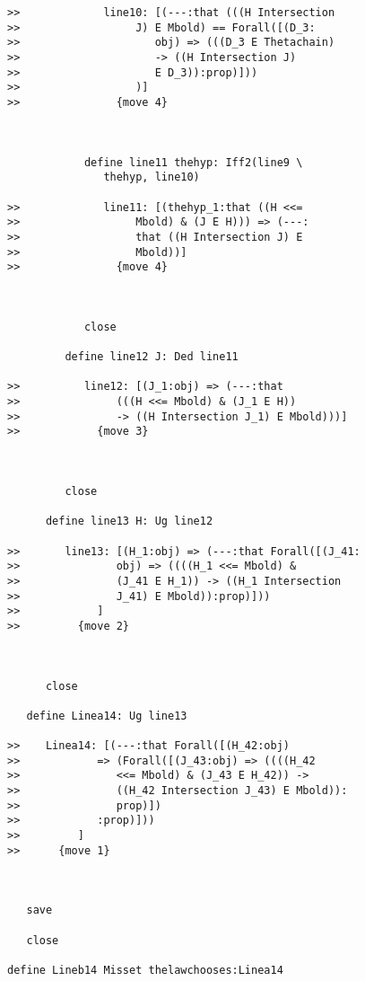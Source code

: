 \documentclass[12pt]{article}
\begin{document}
\begin{verbatim}
>>             line10: [(---:that (((H Intersection
>>                  J) E Mbold) == Forall([(D_3:
>>                     obj) => (((D_3 E Thetachain)
>>                     -> ((H Intersection J)
>>                     E D_3)):prop)]))
>>                  )]
>>               {move 4}



            define line11 thehyp: Iff2(line9 \
               thehyp, line10)

>>             line11: [(thehyp_1:that ((H <<=
>>                  Mbold) & (J E H))) => (---:
>>                  that ((H Intersection J) E
>>                  Mbold))]
>>               {move 4}



            close

         define line12 J: Ded line11

>>          line12: [(J_1:obj) => (---:that
>>               (((H <<= Mbold) & (J_1 E H))
>>               -> ((H Intersection J_1) E Mbold)))]
>>            {move 3}



         close

      define line13 H: Ug line12

>>       line13: [(H_1:obj) => (---:that Forall([(J_41:
>>               obj) => ((((H_1 <<= Mbold) &
>>               (J_41 E H_1)) -> ((H_1 Intersection
>>               J_41) E Mbold)):prop)]))
>>            ]
>>         {move 2}



      close

   define Linea14: Ug line13

>>    Linea14: [(---:that Forall([(H_42:obj)
>>            => (Forall([(J_43:obj) => ((((H_42
>>               <<= Mbold) & (J_43 E H_42)) ->
>>               ((H_42 Intersection J_43) E Mbold)):
>>               prop)])
>>            :prop)]))
>>         ]
>>      {move 1}



   save

   close

define Lineb14 Misset thelawchooses:Linea14



\end{verbatim}
\end{document}
